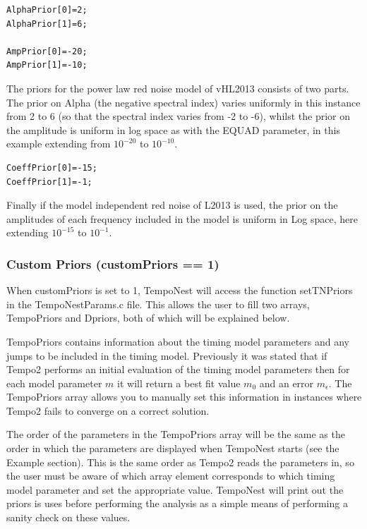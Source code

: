 \documentclass[%
 preprint,
 amsmath,amssymb,amsfonts,
 aps,
]{revtex4-1}
\begin{document}
\begin{lstlisting}
AlphaPrior[0]=2;
AlphaPrior[1]=6;

AmpPrior[0]=-20;
AmpPrior[1]=-10;
\end{lstlisting}
%
The priors for the power law red noise model of vHL2013 consists of two parts.  The prior on Alpha (the negative spectral index) varies uniformly in this instance from 2 to 6 (so that the spectral index varies from -2 to -6), whilst the prior on the amplitude is uniform in log space as with the EQUAD parameter, in this example extending from $10^{-20}$ to $10^{-10}$.
%

\begin{lstlisting}
CoeffPrior[0]=-15;
CoeffPrior[1]=-1;
\end{lstlisting}

Finally if the model independent red noise of L2013 is used, the prior on the amplitudes of each frequency included in the model is uniform in Log space, here extending $10^{-15}$ to $10^{-1}$.

\subsubsection{Custom Priors (customPriors == 1)}
\label{Section:customPriors}

When customPriors is set to 1, TempoNest will access the function setTNPriors in the TempoNestParams.c file.  This allows the user to fill two arrays, TempoPriors and Dpriors, both of which will be explained below.

TempoPriors contains information about the timing model parameters and any jumps to be included in the timing model.  Previously it was stated that if Tempo2 performs an initial evaluation of the timing model parameters then for each model parameter $m$ it will return a best fit value $m_0$ and an error $m_{\epsilon}$.  The TempoPriors array allows you to manually set this information in instances where Tempo2 fails to converge on a correct solution.

The order of the parameters in the TempoPriors array will be the same as the order in which the parameters are displayed when TempoNest starts (see the Example section).  This is the same order as Tempo2 reads the parameters in, so the user must be aware of which array element corresponds to which timing model parameter and set the appropriate value.  TempoNest will print out the priors is uses before performing the analysis as a simple means of performing a sanity check on these values.
\end{document}
